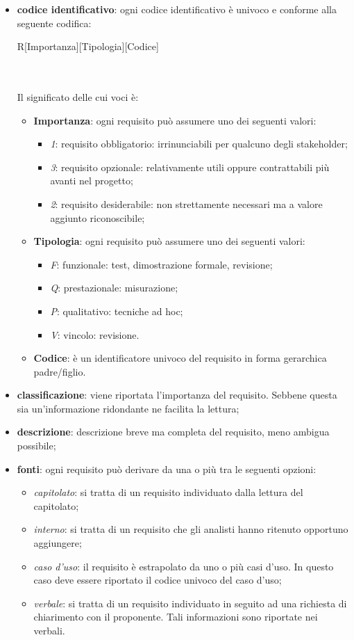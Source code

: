 			\begin{itemize}
				\item \textbf{codice identificativo}: ogni codice identificativo è univoco e conforme alla seguente codifica: \\
				\centerline{R[Importanza][Tipologia][Codice]} \\ \\
				Il significato delle cui voci è:
				\begin{itemize}
					\item \textbf{Importanza}: ogni requisito può assumere uno dei seguenti valori:
					\begin{itemize}
						\item \textit{1}: requisito obbligatorio: irrinunciabili per qualcuno degli stakeholder;
						\item \textit{3}: requisito opzionale: relativamente utili oppure contrattabili più avanti nel progetto;
						\item \textit{2}: requisito desiderabile: non strettamente necessari ma  a valore aggiunto riconoscibile;	
					\end{itemize}
					\item \textbf{Tipologia}: ogni requisito può assumere uno dei seguenti valori:
					\begin{itemize}
						\item \textit{F}: funzionale: test, dimostrazione formale, revisione;
						\item \textit{Q}: prestazionale: misurazione;
						\item \textit{P}: qualitativo: tecniche ad hoc;
						\item \textit{V}: vincolo: revisione.
					\end{itemize}
					\item \textbf{Codice}: è un identificatore univoco del requisito in forma gerarchica padre/figlio.
				\end{itemize}
				\item \textbf{classificazione}: viene riportata l'importanza del requisito. Sebbene questa sia un'informazione ridondante ne facilita la lettura;
				\item \textbf{descrizione}: descrizione breve ma completa del requisito, meno ambigua possibile;
				\item \textbf{fonti}: ogni requisito può derivare da una o più tra le seguenti opzioni:
				\begin{itemize}
					\item \textit{capitolato}: si tratta di un requisito individuato dalla lettura del capitolato;
					\item \textit{interno}: si tratta di un requisito che gli analisti hanno ritenuto opportuno aggiungere;
					\item \textit{caso d'uso}: il requisito è estrapolato da uno o più casi d'uso. In questo caso deve essere riportato il codice univoco del caso d'uso;
					\item \textit{verbale}: si tratta di un requisito individuato in seguito ad una richiesta di chiarimento con il proponente. Tali informazioni sono riportate nei verbali.
				\end{itemize}
			\end{itemize}

